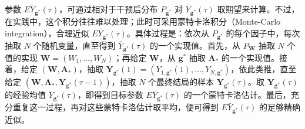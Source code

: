 参数 $E\bar Y_{\mathbf g^*}(\tau)$，可通过相对于干预后分布 $P_{\mathbf g^*}$ 对 $\bar Y_{\mathbf g^*}(\tau)$ 取期望来计算。不过，在实践中，这个积分往往难以处理；此时可采用蒙特卡洛积分（Monte-Carlo integration），合理近似 $E\bar Y_{\mathbf g^*}(\tau)$。具体过程是：依次从 $P_{\mathbf g^*}$ 的每个因子中，每次抽取 $N$ 个随机变量，直至得到 $\bar Y_{\mathbf g^*}(\tau)$ 的一个实现值。首先，从 $P_{\mathbf W}$ 抽取 $N$ 个值的实现 $\mathbf W=(W_1,\ldots,W_N)$；再给定 $\mathbf W$，从 $\mathbf g^*$ 抽取 $\mathbf A_*$ 的一个实现值。接着，给定 $(\mathbf W,\mathbf A_*)$，抽取 $\mathbf Y_{\mathbf g^*}(1)=(Y_{1,\mathbf g^*}(1),\ldots,Y_{N,\mathbf g^*})$，依此类推，直至给定 $(\mathbf W,\mathbf A_*,\mathbf Y_{\mathbf g^*}(\tau-1))$，抽取 $N$ 个最终结局的样本 $\mathbf Y_{\mathbf g^*}(\tau)$。取 $\mathbf Y_{\mathbf g^*}(\tau)$ 的经验均值 $\bar Y_{\mathbf g^*}(\tau)$，即得到目标参数 $E\bar Y_{\mathbf g^*}(\tau)$ 的一个蒙特卡洛估计。最后，充分重复这一过程，再对这些蒙特卡洛估计取平均，便可得到 $E\bar Y_{\mathbf g^*}(\tau)$ 的足够精确近似。
